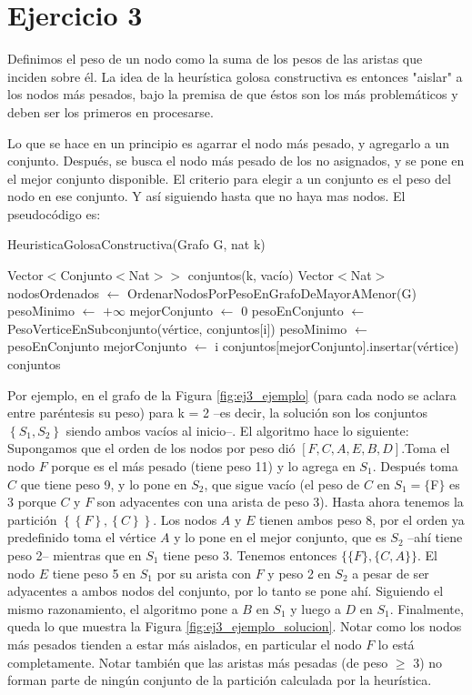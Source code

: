 \section{Ejercicio 3}

Definimos el peso de un nodo como la suma de los pesos de las aristas que inciden sobre él. La idea de la heurística golosa constructiva es entonces "aislar" a los nodos más pesados, bajo la premisa de que éstos son los más problemáticos y deben ser los primeros en procesarse.

Lo que se hace en un principio es agarrar el nodo más pesado, y agregarlo a un conjunto. Después, se busca el nodo más pesado de los no asignados, y se pone en el mejor conjunto disponible. El criterio para elegir a un conjunto es el peso del nodo en ese conjunto. Y así siguiendo hasta que no haya mas nodos. El pseudocódigo es:
\begin{algorithm}[H]
\begin{algorithmic}[1]
\caption{HeuristicaGolosaConstructiva(Grafo G, nat k)}
\STATE Vector$<$Conjunto$<$Nat$>>$ conjuntos(k, vacío)
\STATE Vector$<$Nat$>$ nodosOrdenados $\leftarrow$ OrdenarNodosPorPesoEnGrafoDeMayorAMenor(G)
    \STATE pesoMinimo $\leftarrow$ $+ \infty$
    \STATE mejorConjunto $\leftarrow$ 0
        \STATE pesoEnConjunto $\leftarrow$ PesoVerticeEnSubconjunto(vértice, conjuntos$[$i$]$)
            \STATE pesoMinimo $\leftarrow$ pesoEnConjunto
            \STATE mejorConjunto $\leftarrow$ i
        \ENDIF
    \ENDFOR
    \STATE conjuntos$[$mejorConjunto$]$.insertar(vértice)
\ENDFOR
\RETURN conjuntos
\end{algorithmic}
\end{algorithm}

Por ejemplo, en el grafo de la Figura \ref{fig:ej3_ejemplo} (para cada nodo se aclara entre paréntesis su peso) para k = 2 --es decir, la solución son los conjuntos $\left\{S_1, S_2\right\}$ siendo ambos vacíos al inicio--. El algoritmo hace lo siguiente: Supongamos que el orden de los nodos por peso dió $[F, C, A, E, B, D]$.Toma el nodo $F$ porque es el más pesado (tiene peso 11) y lo agrega en $S_1$. Después toma $C$ que tiene peso 9, y lo pone en $S_2$, que sigue vacío (el peso de $C$ en $S_1 = \{$F$\}$ es 3 porque $C$ y $F$ son adyacentes con una arista de peso 3). Hasta ahora tenemos la partición $\left\{ \left\{F\right\}, \left\{C\right\} \right\}$. Los nodos $A$ y $E$ tienen ambos peso 8, por el orden ya predefinido toma el vértice $A$ y lo pone en el mejor conjunto, que es $S_2$ --ahí tiene peso 2-- mientras que en $S_1$ tiene peso 3. Tenemos entonces $\{ \{F\}, \{C, A\} \}$. El nodo $E$ tiene peso 5 en $S_1$ por su arista con $F$ y peso 2 en $S_2$ a pesar de ser adyacentes a ambos nodos del conjunto, por lo tanto se pone ahí. Siguiendo el mismo razonamiento, el algoritmo pone a $B$ en $S_1$ y luego a $D$ en $S_1$. Finalmente, queda lo que muestra la Figura \ref{fig:ej3_ejemplo_solucion}. Notar como los nodos más pesados tienden a estar más aislados, en particular el nodo $F$ lo está completamente. Notar también que las aristas más pesadas (de peso $\geq$ 3) no forman parte de ningún conjunto de la partición calculada por la heurística.

